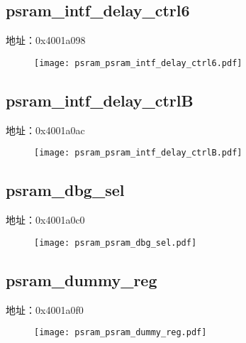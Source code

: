 \subsection{psram\_intf\_delay\_ctrl6}
\label{psram-psram-intf-delay-ctrl6}
地址：0x4001a098
 \begin{figure}[H]
\texttt{[image: psram\_psram\_intf\_delay\_ctrl6.pdf]}
\end{figure}

\subsection{psram\_intf\_delay\_ctrlB}
\label{psram-psram-intf-delay-ctrlB}
地址：0x4001a0ac
 \begin{figure}[H]
\texttt{[image: psram\_psram\_intf\_delay\_ctrlB.pdf]}
\end{figure}

\subsection{psram\_dbg\_sel}
\label{psram-psram-dbg-sel}
地址：0x4001a0c0
 \begin{figure}[H]
\texttt{[image: psram\_psram\_dbg\_sel.pdf]}
\end{figure}

\subsection{psram\_dummy\_reg}
\label{psram-psram-dummy-reg}
地址：0x4001a0f0
 \begin{figure}[H]
\texttt{[image: psram\_psram\_dummy\_reg.pdf]}
\end{figure}

